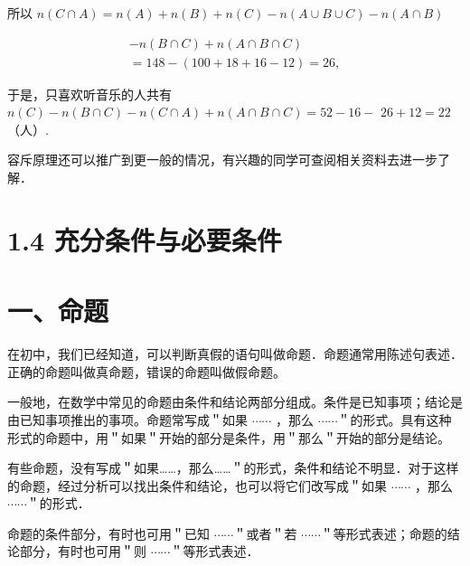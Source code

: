 \documentclass[10pt]{article}
\begin{document}
所以 \(n(C \cap A)=n(A)+n(B)+n(C)-n(A \cup B \cup C)-n(A \cap B)\)

\[
\begin{gathered}
-n(B \cap C)+n(A \cap B \cap C) \\
=148-(100+18+16-12)=26,
\end{gathered}
\]

于是，只喜欢听音乐的人共有 \(n(C)-n(B \cap C)-n(C \cap A)+n(A \cap B \cap C)=52-16-\) \(26+12=22\)（人）.

容斥原理还可以推广到更一般的情况，有兴趣的同学可查阅相关资料去进一步了解．

\section*{1.4 充分条件与必要条件}
\section*{一、命题}
在初中，我们已经知道，可以判断真假的语句叫做命题．命题通常用陈述句表述．正确的命题叫做真命题，错误的命题叫做假命题。

一般地，在数学中常见的命题由条件和结论两部分组成。条件是已知事项；结论是由已知事项推出的事项。命题常写成＂如果 \(\cdots \cdots\) ，那么 \(\cdots \cdots\)＂的形式。具有这种形式的命题中，用＂如果＂开始的部分是条件，用＂那么＂开始的部分是结论。

有些命题，没有写成＂如果……，那么……＂的形式，条件和结论不明显．对于这样的命题，经过分析可以找出条件和结论，也可以将它们改写成＂如果 \(\cdots \cdots\) ，那么 \(\cdots \cdots\)＂的形式．

命题的条件部分，有时也可用＂已知 \(\cdots \cdots\)＂或者＂若 \(\cdots \cdots\)＂等形式表述；命题的结论部分，有时也可用＂则 \(\cdots \cdots\)＂等形式表述．
\end{document}
